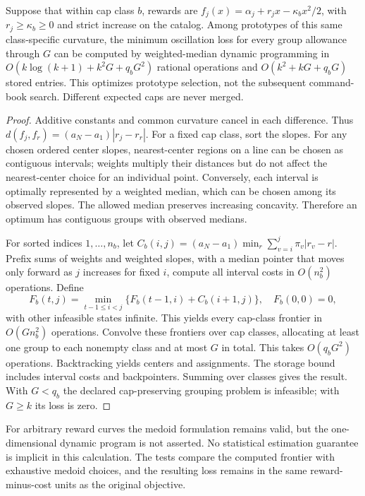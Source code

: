 \begin{theorem}\label{thm:grouping59}
Suppose that within cap class $b$, rewards are $f_j(x)=\alpha_j+r_jx-\kappa_b x^2/2$, with $r_j\geq\kappa_b\geq0$ and strict increase on the catalog. Among prototypes of this same class-specific curvature, the minimum oscillation loss for every group allowance through $G$ can be computed by weighted-median dynamic programming in
$O(k\log(k+1)+k^2G+q_bG^2)$ rational operations and $O(k^2+kG+q_bG)$ stored entries. This optimizes prototype selection, not the subsequent command-book search. Different expected caps are never merged.
\end{theorem}
\begin{proof}
Additive constants and common curvature cancel in each difference. Thus $d(f_j,f_r)=(a_N-a_1)|r_j-r_r|$. For a fixed cap class, sort the slopes. For any chosen ordered center slopes, nearest-center regions on a line can be chosen as contiguous intervals; weights multiply their distances but do not affect the nearest-center choice for an individual point. Conversely, each interval is optimally represented by a weighted median, which can be chosen among its observed slopes. The allowed median preserves increasing concavity. Therefore an optimum has contiguous groups with observed medians.

For sorted indices $1,\ldots,n_b$, let
$C_b(i,j)=(a_N-a_1)\min_r\sum_{v=i}^j\pi_v|r_v-r|$.
Prefix sums of weights and weighted slopes, with a median pointer that moves only forward as $j$ increases for fixed $i$, compute all interval costs in $O(n_b^2)$ operations. Define
\[
 F_b(t,j)=\min_{t-1\leq i<j}\{F_b(t-1,i)+C_b(i+1,j)\},
 \quad F_b(0,0)=0,
\]
with other infeasible states infinite. This yields every cap-class frontier in $O(Gn_b^2)$ operations. Convolve these frontiers over cap classes, allocating at least one group to each nonempty class and at most $G$ in total. This takes $O(q_bG^2)$ operations. Backtracking yields centers and assignments. The storage bound includes interval costs and backpointers. Summing over classes gives the result. With $G<q_b$ the declared cap-preserving grouping problem is infeasible; with $G\geq k$ its loss is zero.
\end{proof}

For arbitrary reward curves the medoid formulation remains valid, but the one-dimensional dynamic program is not asserted. No statistical estimation guarantee is implicit in this calculation. The tests compare the computed frontier with exhaustive medoid choices, and the resulting loss remains in the same reward-minus-cost units as the original objective.
